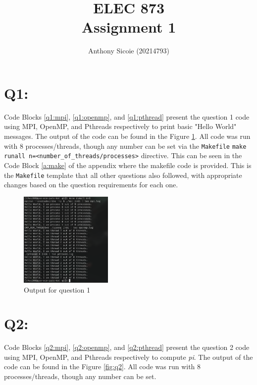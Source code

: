 \documentclass[11pt]{article}
\title{%
  ELEC 873 \\
Assignment 1}
\author{Anthony Sicoie (20214793)}
\begin{document}
\maketitle


\section*{Q1:}

Code Blocks \ref{q1:mpi}, \ref{q1:openmp}, and \ref{q1:pthread} present the question 1 code using MPI, OpenMP, and Pthreads respectively to print basic "Hello World" messages.
The output of the code can be found in the Figure \ref{fig:q1}.
All code was run with 8 processes/threads, though any number can be set via the \texttt{Makefile} \texttt{make runall n=<number\_of\_threads/processes>} directive. 
This can be seen in the Code Block \ref{a:make} of the appendix where the makefile code is provided.
This is the \texttt{Makefile} template that all other questions also followed, with appropriate changes based on the question requirements for each one.






\begin{figure}[H]
\centering
    \includegraphics[width=0.4\textwidth]{./images/q1.png}
\caption{Output for question 1}
\label{fig:q1}
\end{figure}

\newpage

\section*{Q2:}

Code Blocks \ref{q2:mpi}, \ref{q2:openmp}, and \ref{q2:pthread} present the question 2 code using MPI, OpenMP, and Pthreads respectively to compute \textit{pi}.
The output of the code can be found in the Figure \ref{fig:q2}.
All code was run with 8 processes/threads, though any number can be set. 
\end{document}
